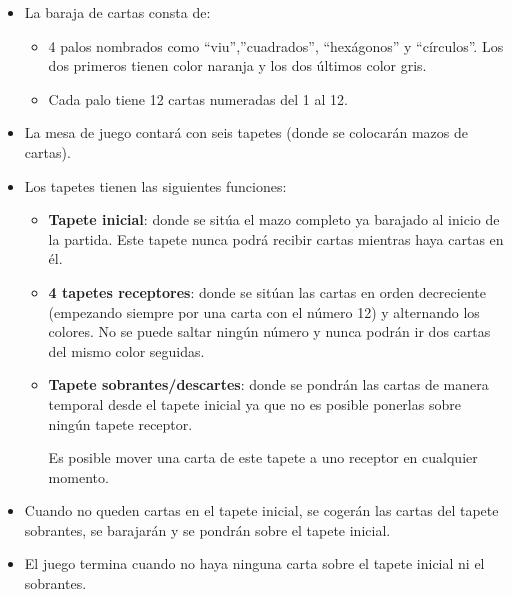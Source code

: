 \documentclass{\ClassPath/viu-tfm-template}
\begin{document}
\vspace{-1em}
\begin{itemize}
    \item La baraja de cartas consta de:
    \begin{itemize}
        \item 4 palos nombrados como “viu”,”cuadrados”, “hexágonos” y “círculos”. Los dos primeros tienen color naranja y los dos últimos color gris.
        \item Cada palo tiene 12 cartas numeradas del 1 al 12.
    \end{itemize}
    \item La mesa de juego contará con seis tapetes (donde se colocarán mazos de cartas).
    \item Los tapetes tienen las siguientes funciones:
    \begin{itemize}
        \item \textbf{Tapete inicial}: donde se sitúa el mazo completo ya barajado al inicio de la partida. Este tapete nunca podrá recibir cartas mientras haya cartas en él.
        \item \textbf{4 tapetes receptores}: donde se sitúan las cartas en orden decreciente (empezando siempre por una carta con el número 12) y alternando los colores. No se puede saltar ningún número y nunca podrán ir dos cartas del mismo color seguidas.
        \item \textbf{Tapete sobrantes/descartes}: donde se pondrán las cartas de manera temporal desde el tapete inicial ya que no es posible ponerlas sobre ningún tapete receptor.

        Es posible mover una carta de este tapete a uno receptor en cualquier momento.
    \end{itemize}

    \item Cuando no queden cartas en el tapete inicial, se cogerán las cartas del  tapete sobrantes, se barajarán y se pondrán sobre el tapete inicial.

    \item El juego termina cuando no haya ninguna carta sobre el tapete inicial ni el sobrantes.
\end{itemize}
\vspace{-1em}
\end{document}
